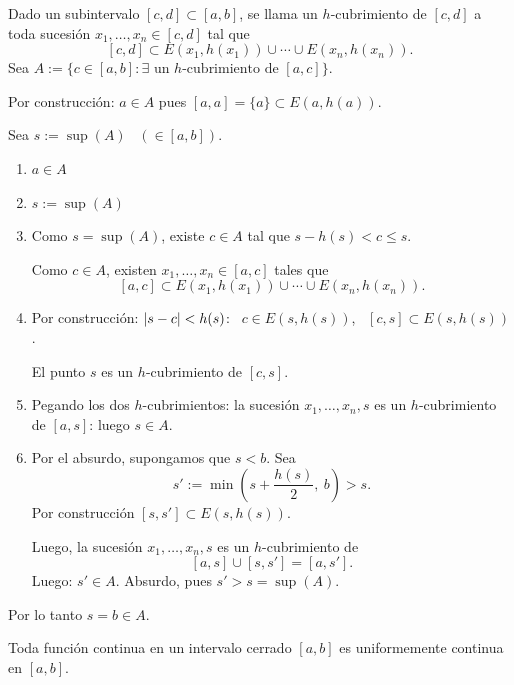 \documentclass[11pt,a4paper]{article}
\begin{document}
\begin{demo}
Dado un subintervalo $[c,d]\subset[a,b]$, se llama un $h$-cubrimiento de $[c,d]$ a toda sucesión $x_1,\dots,x_n\in[c,d]$ tal que
\[
  [c,d]\subset E(x_1,h(x_1))\cup\cdots\cup E(x_n,h(x_n)).
\]
Sea $A:=\{c\in[a,b] : \exists \text{ un } h\text{-cubrimiento de } [a,c]\}$.

Por construcción: $a\in A$ pues $[a,a]=\{a\}\subset E(a,h(a))$.

Sea $s:=\sup(A)$ \ $(\in[a,b])$.
\begin{enumerate}[label=(\arabic*)]
  \item $a\in A$
  \item $s:=\sup(A)$
  \item Como $s=\sup(A)$, existe $c\in A$ tal que $s-h(s)<c\leq s$.

  Como $c\in A$, existen $x_1,\dots,x_n\in[a,c]$ tales que
  \[
    [a,c]\subset E(x_1,h(x_1))\cup\cdots\cup E(x_n,h(x_n)).
  \]
  \item Por construcción: $\lvert s-c\rvert<h(s)$: \ $c\in E(s,h(s))$, \ $[c,s]\subset E(s,h(s))$.

  El punto $s$ es un $h$-cubrimiento de $[c,s]$.
  \item Pegando los dos $h$-cubrimientos: la sucesión $x_1,\dots,x_n,s$  es un $h$-cubrimiento de $[a,s]$: luego $s\in A$.
  \item Por el absurdo, supongamos que $s<b$. Sea
  \[
    s':=\min\left(s+\frac{h(s)}{2},\ b\right)>s.
  \]
  Por construcción $[s,s']\subset E(s,h(s))$.

  Luego, la sucesión $x_1,\dots,x_n,s$ es un $h$-cubrimiento de
  \[
    [a,s]\cup[s,s']=[a,s'].
  \]
  Luego: $s'\in A$. Absurdo, pues $s'>s=\sup(A)$.
\end{enumerate}
Por lo tanto $s=b\in A$.
\end{demo}

\begin{teorema}
Toda función continua en un intervalo cerrado $[a,b]$ es uniformemente continua en $[a,b]$.
\end{teorema}
\end{document}
